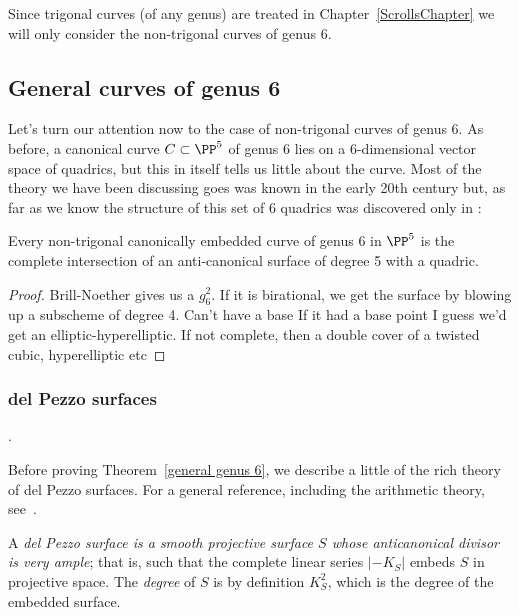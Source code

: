 Since trigonal curves (of any genus) are treated in Chapter~\ref{ScrollsChapter} we will only consider the non-trigonal
curves of genus 6.

\subsection{General curves of genus 6} 

Let's turn our attention now to the case of non-trigonal curves of genus 6. As before, a canonical curve $C \subset \PP^5$ of genus 6 lies on a 6-dimensional vector space of quadrics, but this in itself tells us little about the curve. Most of the theory we have been discussing goes was known in the early 20th century but, as far as we know the structure of this set of
6 quadrics was discovered only in \cite{}:

\begin{theorem}\label{general genus 6}
Every non-trigonal canonically embedded curve of genus 6 in $\PP^5$ is the complete intersection of an anti-canonical surface of degree 5 with a quadric.
\end{theorem}

\begin{proof}
 Brill-Noether gives us a $g^2_6$. If it is birational, we get the surface by blowing up a subscheme of degree 4. Can't have a base If it had a base point I guess we'd get an elliptic-hyperelliptic. If not complete, then a double cover of a twisted cubic, hyperelliptic etc
\end{proof}

\subsubsection{del Pezzo surfaces}

.

Before proving Theorem~\ref{general genus 6}, we describe a little of the rich theory of del Pezzo surfaces. For a general reference, including the arithmetic theory, see~\cite{Manin, Cubic Surfaces}.

\begin{definition}
 A \emph{del Pezzo surface  is a smooth projective surface $S$ whose anticanonical divisor is very ample}; that is, such that 
 the complete linear series $
|-K_S|$ embeds $S$ in projective space. The \emph{degree} of $S$ is by definition $K_S^2$, which is the degree of
the embedded surface.
\end{definition}

